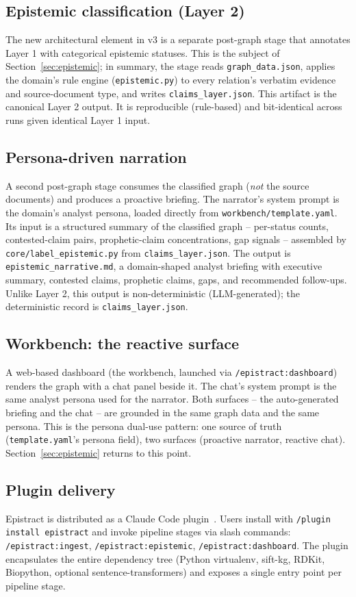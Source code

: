 \subsection{Epistemic classification (Layer 2)}

The new architectural element in v3 is a separate post-graph stage that annotates Layer 1 with categorical epistemic statuses. This is the subject of Section~\ref{sec:epistemic}; in summary, the stage reads \texttt{graph\_data.json}, applies the domain's rule engine (\texttt{epistemic.py}) to every relation's verbatim evidence and source-document type, and writes \texttt{claims\_layer.json}. This artifact is the canonical Layer 2 output. It is reproducible (rule-based) and bit-identical across runs given identical Layer 1 input.

\subsection{Persona-driven narration}

A second post-graph stage consumes the classified graph (\emph{not} the source documents) and produces a proactive briefing. The narrator's system prompt is the domain's analyst persona, loaded directly from \texttt{workbench/template.yaml}. Its input is a structured summary of the classified graph -- per-status counts, contested-claim pairs, prophetic-claim concentrations, gap signals -- assembled by \texttt{core/label\_epistemic.py} from \texttt{claims\_layer.json}. The output is \texttt{epistemic\_narrative.md}, a domain-shaped analyst briefing with executive summary, contested claims, prophetic claims, gaps, and recommended follow-ups. Unlike Layer 2, this output is non-deterministic (LLM-generated); the deterministic record is \texttt{claims\_layer.json}.

\subsection{Workbench: the reactive surface}

A web-based dashboard (the workbench, launched via \texttt{/epistract:dashboard}) renders the graph with a chat panel beside it. The chat's system prompt is the same analyst persona used for the narrator. Both surfaces -- the auto-generated briefing and the chat -- are grounded in the same graph data and the same persona. This is the persona dual-use pattern: one source of truth (\texttt{template.yaml}'s persona field), two surfaces (proactive narrator, reactive chat). Section~\ref{sec:epistemic} returns to this point.

\subsection{Plugin delivery}

Epistract is distributed as a Claude Code plugin~\cite{claudecode2024}. Users install with \texttt{/plugin install epistract} and invoke pipeline stages via slash commands: \texttt{/epistract:ingest}, \texttt{/epistract:epistemic}, \texttt{/epistract:dashboard}. The plugin encapsulates the entire dependency tree (Python virtualenv, sift-kg, RDKit, Biopython, optional sentence-transformers) and exposes a single entry point per pipeline stage.
